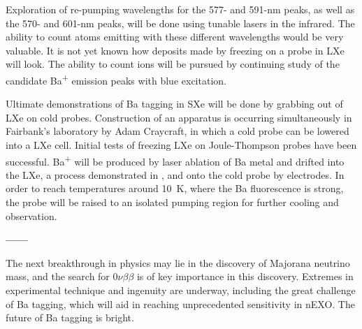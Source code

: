 Exploration of re-pumping wavelengths for the 577- and 591-nm peaks, as well as the 570- and 601-nm peaks, will be done using tunable lasers in the infrared.  The ability to count atoms emitting with these different wavelengths would be very valuable.  It is not yet known how deposits made by freezing on a probe in LXe will look.  The ability to count ions will be pursued by continuing study of the candidate Ba\textsuperscript{+} emission peaks with blue excitation.

Ultimate demonstrations of Ba tagging in SXe will be done by grabbing out of LXe on cold probes.  Construction of an apparatus is occurring simultaneously in Fairbank's laboratory by Adam Craycraft, in which a cold probe can be lowered into a LXe cell.  Initial tests of freezing LXe on Joule-Thompson probes have been successful.  Ba\textsuperscript{+} will be produced by laser ablation of Ba metal and drifted into the LXe, a process demonstrated in \cite{Kendy}, and onto the cold probe by electrodes.  In order to reach temperatures around 10~K, where the Ba fluorescence is strong, the probe will be raised to an isolated pumping region for further cooling and observation.

\begin{center}
\textbf{------}
\end{center}

The next breakthrough in physics may lie in the discovery of Majorana neutrino mass, and the search for $0\nu\beta\beta$ is of key importance in this discovery.  Extremes in experimental technique and ingenuity are underway, including the great challenge of Ba tagging, which will aid in reaching unprecedented sensitivity in nEXO.  The future of Ba tagging is bright.
